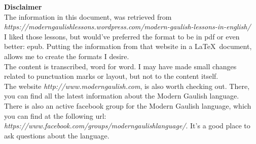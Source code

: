 \begin{center}
\textbf{Disclaimer}\\
\bigskip
\noindent The information in this document, was retrieved from \textit{https://moderngaulishlessons.wordpress.com/modern-gaulish-lessons-in-english/}\\
\bigskip
\noindent I liked those lessons, but would've preferred the format to be in pdf or even better: epub. Putting the information from that website in a \LaTeX\ document, allows me to create the formats I desire.\\The content is transcribed, word for word. I may have made small changes related to punctuation marks or layout, but not to the content itself.\\
\bigskip
\noindent The website \textit{http://www.moderngaulish.com}, is also worth checking out. There, you can find all the latest information about the Modern Gaulish language.\\
\bigskip
\noindent There is also an active facebook group for the Modern Gaulish language, which you can find at the following url: \textit{https://www.facebook.com/groups/moderngaulishlanguage/}. It's a good place to ask questions about the language.
\end{center}
